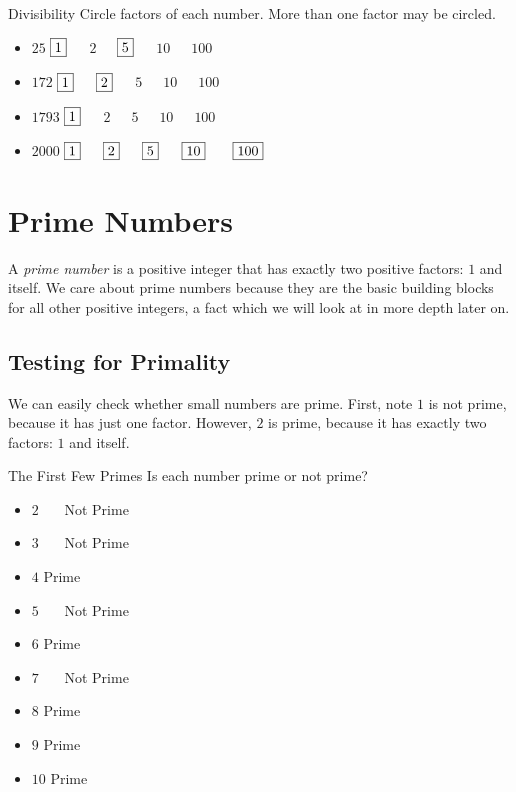 \documentclass[a4paper,10pt]{report}
\begin{document}
\begin{problem}{Divisibility}
 Circle factors of each number. More than one factor may be circled.

 \begin{itemize}
  \item \(25\) \hfill \(\Ans{1}\)~~~\(2\)~~~\(\Ans{5}\)~~~\(10\)~~~\(100\)
  \item \(172\) \hfill \(\Ans{1}\)~~~\(\Ans{2}\)~~~\(5\)~~~\(10\)~~~\(100\)
  \item \(1793\) \hfill \(\Ans{1}\)~~~\(2\)~~~\(5\)~~~\(10\)~~~\(100\)
  \item \(2000\) \hfill \(\Ans{1}\)~~~\(\Ans{2}\)~~~\(\Ans{5}\)~~~\(\Ans{10}\)
  ~~~\(\Ans{100}\)
 \end{itemize}
\end{problem}

\chapter{Prime Numbers}

A \emph{prime number} is a positive integer that has exactly two positive
factors: \(1\) and itself. We care about prime numbers because they are the
basic building blocks for all other positive integers, a fact which we will
look at in more depth later on.

\section{Testing for Primality}

We can easily check whether small numbers are prime. First, note \(1\) is not
prime, because it has just one factor. However, \(2\) is prime, because it has
exactly two factors: \(1\) and itself.

\begin{problem}{The First Few Primes}
 Is each number prime or not prime?

 \begin{itemize}
  \item \(2\) \hfill {}~~~Not Prime
  \item \(3\) \hfill {}~~~Not Prime
  \item \(4\) \hfill Prime~~~
  \item \(5\) \hfill {}~~~Not Prime
  \item \(6\) \hfill Prime~~~
  \item \(7\) \hfill {}~~~Not Prime
  \item \(8\) \hfill Prime~~~
  \item \(9\) \hfill Prime~~~
  \item \(10\) \hfill Prime~~~
 \end{itemize}
\end{problem}
\end{document}

